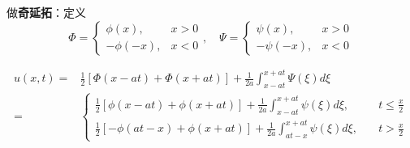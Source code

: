 做\textbf{奇延拓}：定义
$$\Phi=\left\{
    \begin{aligned}
        \phi(x),&x>0\\
        -\phi(-x),&x<0
    \end{aligned}
\right.,\quad
\Psi=\left\{
        \begin{aligned}
            \psi(x),&x>0\\
            -\psi(-x),&x<0
        \end{aligned}
\right.$$

$$\begin{aligned}
    u(x,t)=&\frac{1}{2}[\Phi(x-at)+\Phi(x+at)]+\frac{1}{2a}\int^{x+at}_{x-at}\Psi(\xi)d\xi\\
    =&\left\{
    \begin{aligned}
        \frac{1}{2}[\phi(x-at)+\phi(x+at)]+\frac{1}{2a}\int^{x+at}_{x-at}\psi(\xi)d\xi,\quad&t\le\frac{x}{2}\\
        \frac{1}{2}[-\phi(at-x)+\phi(x+at)]+\frac{1}{2a}\int^{x+at}_{at-x}\psi(\xi)d\xi,\quad&t>\frac{x}{2}
    \end{aligned}
    \right.
    \end{aligned}$$


